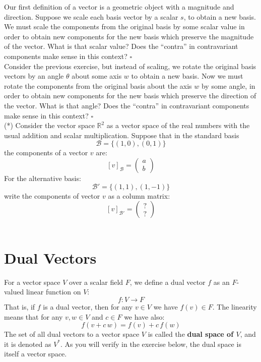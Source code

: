 \documentclass[12pt]{article}
\begin{document}
\exercise Our first definition of a vector is a geometric object with
a magnitude and direction.  Suppose we scale each basis vector by a
scalar $s$, to obtain a new basis.  We must scale the components from
the original basis by some scalar value in order to obtain new
components for the new basis which preserve the magnitude of the
vector.  What is that scalar value?  Does the ``contra'' in
contravariant components make sense in this context?  $\square$
\\[3pt]

\exercise Consider the previous exercise, but instead of scaling, we
rotate the original basis vectors by an angle $\theta$ about some axis
$w$ to obtain a new basis.  Now we must rotate the components from the
original basis about the axis $w$ by some angle, in order to obtain
new components for the new basis which preserve the direction of the
vector.  What is that angle?  Does the ``contra'' in contravariant
components make sense in this context?  $\square$ \\[3pt]

\exercise (*) Consider the vector space $\mathbb{R}^2$ as a vector
space of the real numbers with the usual addition and scalar
multiplication.  Suppose that in the standard basis
$$\mathcal{B} = \{(1,0), (0,1)\}$$
the components of a vector $v$ are:
$$[v]_\mathcal{B} = \begin{pmatrix} a \\ b \end{pmatrix}$$
For the alternative basis:
$$\mathcal{B}' = \{(1,1), (1,-1)\}$$
write the components of vector $v$ as a column matrix:
$$[v]_{\mathcal{B}'} = \begin{pmatrix} ? \\ ? \end{pmatrix}$$\\[3pt]




\section{Dual Vectors}

For a vector space $V$ over a scalar field $F$, we define a dual
vector $f$ as an $F$-valued linear function on $V$:
$$f: V \to F $$
That is, if $f$ is a dual vector, then for any $v \in V$ we have $f(v)
\in F$.  The linearity means that for any $v,w \in V$ and $c \in F$ we
have also:
$$f(v + c \, w) = f(v) + c \, f(w)$$
The set of all dual vectors to a vector space $V$ is called the {\bf
  dual space of $V$}, and it is denoted as $V^*$.  As you will verify in the
exercise below, the dual space is itself a vector space.\\[3pt]
\end{document}
